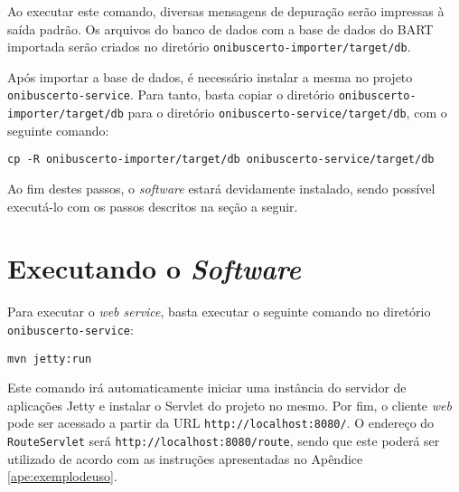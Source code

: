 Ao executar este comando, diversas mensagens de depuração serão impressas à saída padrão.
Os arquivos do banco de dados com a base de dados do BART importada serão criados no diretório \texttt{onibuscerto-importer/target/db}.

Após importar a base de dados, é necessário instalar a mesma no projeto \texttt{onibuscerto-service}.
Para tanto, basta copiar o diretório \texttt{onibuscerto-importer/target/db} para o diretório \texttt{onibuscerto-service/target/db}, com o seguinte comando:

\lstset{language=bash}
\begin{lstlisting}
cp -R onibuscerto-importer/target/db onibuscerto-service/target/db
\end{lstlisting}

Ao fim destes passos, o \emph{software} estará devidamente instalado, sendo possível executá-lo com os passos descritos na seção a seguir.

\section{Executando o \emph{Software}}

Para executar o \emph{web service}, basta executar o seguinte comando no diretório \texttt{onibuscerto-service}:

\lstset{language=bash}
\begin{lstlisting}
mvn jetty:run
\end{lstlisting}

Este comando irá automaticamente iniciar uma instância do servidor de aplicações Jetty e instalar o Servlet do projeto no mesmo.
Por fim, o cliente \emph{web} pode ser acessado a partir da URL \texttt{http://localhost:8080/}.
O endereço do \texttt{RouteServlet} será \texttt{http://localhost:8080/route}, sendo que este poderá ser utilizado de acordo com as instruções apresentadas no Apêndice \ref{ape:exemplodeuso}.
